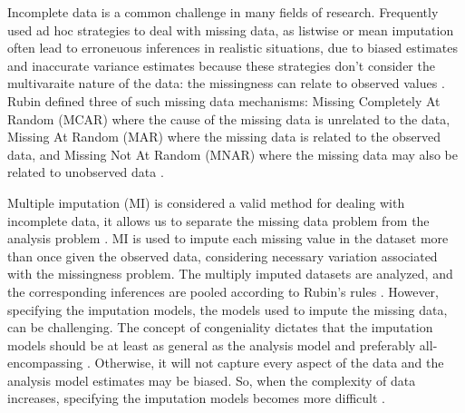 \documentclass[10pt, a4paper, titlepage]{article}
\begin{document}
Incomplete data is a common challenge in many fields of research. Frequently used ad hoc strategies to deal with missing data, as listwise or mean imputation often lead to erroneuous inferences in realistic situations, due to biased estimates and inaccurate variance estimates because these strategies don't consider the multivaraite nature of the data: the missingness can relate to observed values \citep{buurenFlexibleImputationMissing2018, kang2013, enders2017, austin2021}. Rubin defined three of such missing data mechanisms: Missing Completely At Random (MCAR) where the cause of the missing data is unrelated to the data, Missing At Random (MAR) where the missing data is related to the observed data, and Missing Not At Random (MNAR) where the missing data may also be related to unobserved data \citep{rubin1976}.

Multiple imputation (MI) \citep{rubin1987} is considered a valid method for dealing with incomplete data, it allows us to separate the missing data problem from the analysis problem \citep{mistlerComparisonJointModel2017, buurenFlexibleImputationMissing2018, enders2017, burgette2010, austin2021, audigier2018, vanbuuren2007, grund2021, hughes2014}. MI is used to impute each missing value in the dataset more than once given the observed data, considering necessary variation associated with the missingness problem. The multiply imputed datasets are analyzed, and the corresponding inferences are pooled according to Rubin's rules \citep{buurenFlexibleImputationMissing2018, austin2021, rubin1987, carpenter2013}. However, specifying the imputation models, the models used to impute the missing data, can be challenging. The concept of congeniality dictates that the imputation models should be at least as general as the analysis model and preferably all-encompassing \citep{grund2018, enders2018, meng1994multiple, bartlett2015, grund2016}. Otherwise, it will not capture every aspect of the data and the analysis model estimates may be biased. So, when the complexity of data increases, specifying the imputation models becomes more difficult \citep{grund2018, buurenFlexibleImputationMissing2018}.
\end{document}

